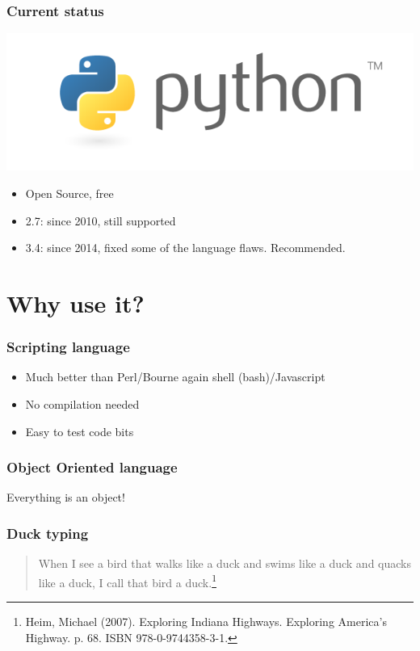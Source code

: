 \documentclass[14pt]{beamer}
\begin{document}
\begin{frame}
\frametitle{Current status}
\includegraphics[width=\textwidth]{python-logo-master-v3-TM.png}

\begin{itemize}
\item Open Source, free
\item 2.7: since 2010, still supported
\item 3.4: since 2014, fixed some of the language flaws. Recommended.
\end{itemize}
\end{frame}

\section{Why use it?}

\begin{frame}
\frametitle{Scripting language}



\begin{itemize}
\item Much better than Perl/Bourne again shell (bash)/Javascript
\item No compilation needed
\item Easy to test code bits
\end{itemize}
\end{frame}

\begin{frame}
\frametitle{Object Oriented language}
\begin{center}
\alert{Everything is an object!}
\end{center}

\end{frame}

\begin{frame}
\frametitle{Duck typing}
\begin{quote}
When I see a bird that walks like a duck and swims like a duck and quacks like a duck, I call that bird a duck.\footnote{ Heim, Michael (2007). Exploring Indiana Highways. Exploring America's Highway. p. 68. ISBN 978-0-9744358-3-1.}
\end{quote}
\end{frame}
\end{document}
